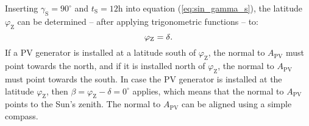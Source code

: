 Inserting $\gamma_{\mathrm{S}} = 90^\circ$ and $t_{\mathrm{S}} = 12\mathrm{h}$ into equation (\ref{eq:sin_gamma_s}), the latitude $\varphi_{\mathrm{Z}}$ can be determined -- after applying trigonometric functions -- to:
	\begin{equation} \label{eq:phi_z}
	\centering
		\varphi_{\mathrm{Z}} = \delta \text{.}
	\end{equation}
If a PV generator is installed at a latitude south of $\varphi_{\mathrm{Z}}$, the normal to $A_{\mathrm{PV}}$ must point towards the north, and if it is installed north of $\varphi_{\mathrm{Z}}$, the normal to $A_{\mathrm{PV}}$ must point towards the south. In case the PV generator is installed at the latitude $\varphi_{\mathrm{Z}}$, then $\beta = \varphi_{\mathrm{Z}} - \delta = 0^\circ$ applies, which means that the normal to $A_{\mathrm{PV}}$ points to the Sun's zenith. The normal to $A_{\mathrm{PV}}$ can be aligned using a simple compass.
